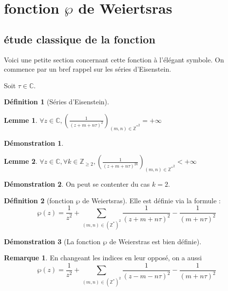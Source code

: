 \documentclass{article}
\newcommand{\C}{\mathbb{C}} %
\newcommand{\Z}{\mathbb{Z}} %
\theoremstyle{definition} %
\newtheorem{defi}{Définition}
\newtheorem{rmq}{Remarque}
\newtheorem{lem}{Lemme}
\newtheorem{dem}{Démonstration}
\newcommand{\1}{\mathbb{1}} %
\begin{document}
\section{fonction $\wp$ de Weiertsras}

\subsection{étude classique de la fonction}

Voici une petite section concernant cette fonction à l'élégant symbole.
On commence par un bref rappel sur les séries d'Eisenstein.

Soit $\tau \in \C$.

\begin{defi}[Séries d'Eisenstein]

\end{defi}

\begin{lem}
$\forall z \in \C, \left( \frac{1}{(z + m + n \tau)^2} \right)_{(m,n)\in {\Z^*}^2} = +\infty$ 
\end{lem}

\begin{dem}
\end{dem}

\begin{lem}
$\forall z \in \C, \forall k \in \Z_{\geq 2}, \left( \frac{1}{(z + m + n \tau)^{2k}} \right)_{(m,n)\in {\Z^*}^2} < +\infty$
\end{lem}


\begin{dem}
On peut se contenter du cas $k=2$.
\end{dem}


\begin{defi}[fonction $\wp$ de Weiertsras]
    Elle est définie via la formule :
    $$\wp(z) = \frac{1}{z^2} + \sum_{(m,n) \in {(\Z^*)}^2 } \frac{1}{(z+m+n \tau)^2} -  \frac{1}{(m+n \tau)^2}$$

\end{defi}

\begin{dem}[La fonction $\wp$ de Weierstras est bien définie]
\end{dem}

\begin{rmq}
En changeant les indices en leur opposé, on a aussi
$$\wp(z)=\frac{1}{z^2} +  \sum_{(m,n) \in {(\Z^*)}^2 } \frac{1}{(z-m-n \tau)^2} -  \frac{1}{(m+n \tau)^2} $$
\end{rmq}
\end{document}
